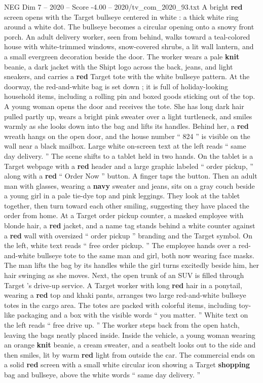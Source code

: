 \begin{textsample}{NEG Dim 7 – 2020 – Score -4.00 – 2020/tv\_com\_2020\_93.txt}  \label{ex:f7_neg_015}
A bright \textbf{red} screen opens with the Target bullseye centered in white : a thick white ring around a white dot.
The bullseye becomes a circular opening onto a snowy front porch.
An adult delivery worker, seen from behind, walks toward a teal-colored house with white-trimmed windows, snow-covered shrubs, a lit wall lantern, and a small evergreen decoration beside the door.
The worker wears a pale \textbf{knit} beanie, a dark jacket with the Shipt logo across the back, jeans, and light sneakers, and carries a \textbf{red} Target tote with the white bullseye pattern.
At the doorway, the red-and-white bag is set down ; it is full of holiday-looking household items, including a rolling pin and boxed goods sticking out of the top.
A young woman opens the door and receives the tote.
She has long dark hair pulled partly up, wears a bright pink sweater over a light turtleneck, and smiles warmly as she looks down into the bag and lifts its handles.
Behind her, a \textbf{red} wreath hangs on the open door, and the house number “ 824 ” is visible on the wall near a black mailbox.
Large white on-screen text at the left reads “ same day delivery. ” The scene shifts to a tablet held in two hands.
On the tablet is a Target webpage with a \textbf{red} header and a large graphic labeled “ order pickup, ” along with a \textbf{red} “ Order Now ” button.
A finger taps the button.
Then an adult man with glasses, wearing a \textbf{navy} sweater and jeans, sits on a gray couch beside a young girl in a pale tie-dye top and pink leggings.
They look at the tablet together, then turn toward each other smiling, suggesting they have placed the order from home.
At a Target order pickup counter, a masked employee with blonde hair, a \textbf{red} jacket, and a name tag stands behind a white counter against a \textbf{red} wall with oversized “ order pickup ” branding and the Target symbol.
On the left, white text reads “ free order pickup. ” The employee hands over a red-and-white bullseye tote to the same man and girl, both now wearing face masks.
The man lifts the bag by its handles while the girl turns excitedly beside him, her hair swinging as she moves.
Next, the open trunk of an SUV is filled through Target ’s drive-up service.
A Target worker with long \textbf{red} hair in a ponytail, wearing a \textbf{red} top and khaki pants, arranges two large red-and-white bullseye totes in the cargo area.
The totes are packed with colorful items, including toy-like packaging and a box with the visible words “ you matter. ” White text on the left reads “ free drive up. ” The worker steps back from the open hatch, leaving the bags neatly placed inside.
Inside the vehicle, a young woman wearing an orange \textbf{knit} beanie, a cream sweater, and a seatbelt looks out to the side and then smiles, lit by warm \textbf{red} light from outside the car.
The commercial ends on a solid \textbf{red} screen with a small white circular icon showing a Target \textbf{shopping} bag and bullseye, above the white words “ same day delivery. ”

\end{textsample}

